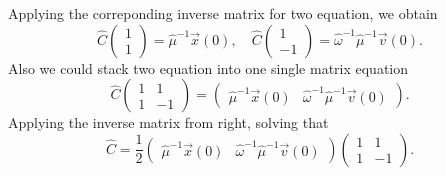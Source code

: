 \documentclass[12pt]{article}%
\begin{document}
	Applying the correponding inverse matrix for two equation, we obtain
	\begin{equation}
	\hat{C}\begin{pmatrix}1\\1\end{pmatrix} = \hat{\mu}^{-1}\vec{x}\left(0\right) ,\quad
	\hat{C}\begin{pmatrix}1\\-1\end{pmatrix} = \hat{\omega}^{-1}\hat{\mu}^{-1}\vec{v}\left(0\right).
	\end{equation}
	Also we could stack two equation into one single matrix equation
	\begin{equation}
	\hat{C}\begin{pmatrix}1&1\\ 1&-1\end{pmatrix} = 
	\begin{pmatrix}
		\hat{\mu}^{-1}\vec{x}\left(0\right) & 
		\hat{\omega}^{-1}\hat{\mu}^{-1}\vec{v}\left(0\right)
	\end{pmatrix}.
	\end{equation}
	Applying the inverse matrix from right, solving that
	\begin{equation}
	\hat{C} = \frac{1}{2}
	\begin{pmatrix}
		\hat{\mu}^{-1}\vec{x}\left(0\right) & 
		\hat{\omega}^{-1}\hat{\mu}^{-1}\vec{v}\left(0\right)
	\end{pmatrix}\begin{pmatrix}1&1\\ 1&-1\end{pmatrix}.
	\end{equation}
\end{document}
